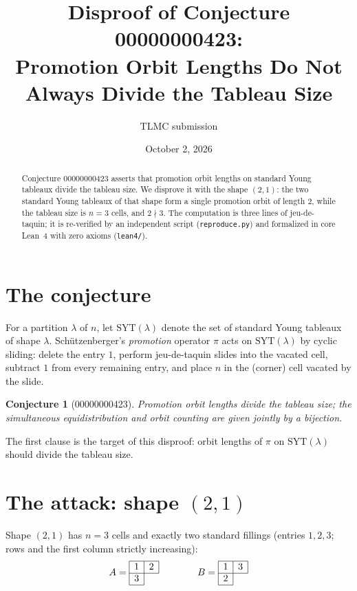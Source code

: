\documentclass{article}
\title{Disproof of Conjecture 00000000423:\\Promotion Orbit Lengths Do Not Always Divide the Tableau Size}
\author{TLMC submission}
\date{October 2, 2026}
\newtheorem{conjecture}{Conjecture}
\begin{document}
\maketitle

\begin{abstract}
Conjecture 00000000423 asserts that promotion orbit lengths on standard Young
tableaux divide the tableau size. We disprove it with the shape $(2,1)$: the
two standard Young tableaux of that shape form a single promotion orbit of
length $2$, while the tableau size is $n=3$ cells, and $2\nmid 3$. The
computation is three lines of jeu-de-taquin; it is re-verified by an
independent script (\texttt{reproduce.py}) and formalized in core Lean~4 with
zero axioms (\texttt{lean4/}).
\end{abstract}

\section{The conjecture}

For a partition $\lambda$ of $n$, let $\mathrm{SYT}(\lambda)$ denote the set
of standard Young tableaux of shape $\lambda$. Sch\"utzenberger's
\emph{promotion} operator $\pi$ acts on $\mathrm{SYT}(\lambda)$ by cyclic
sliding: delete the entry $1$, perform jeu-de-taquin slides into the vacated
cell, subtract $1$ from every remaining entry, and place $n$ in the (corner)
cell vacated by the slide.

\begin{conjecture}[00000000423]
Promotion orbit lengths divide the tableau size; the simultaneous
equidistribution and orbit counting are given jointly by a bijection.
\end{conjecture}

The first clause is the target of this disproof: orbit lengths of $\pi$ on
$\mathrm{SYT}(\lambda)$ should divide the tableau size.

\section{The attack: shape $(2,1)$}

Shape $(2,1)$ has $n=3$ cells and exactly two standard fillings
(entries $1,2,3$; rows and the first column strictly increasing):
\[
A=\begin{array}{|c|c|}\hline 1&2\\\cline{1-2}\multicolumn{1}{|c|}{3}&\multicolumn{1}{c}{}\\\cline{1-1}
\end{array}
\qquad\qquad
B=\begin{array}{|c|c|}\hline 1&3\\\cline{1-2}\multicolumn{1}{|c|}{2}&\multicolumn{1}{c}{}\\\cline{1-1}
\end{array}
\]
\end{document}
